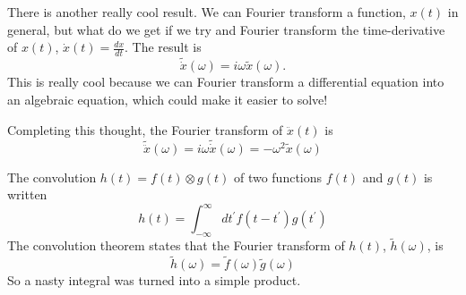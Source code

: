 \documentclass[]{revtex4}
\newcommand{\sm}[1]{{\[#1\]}}
\begin{document}
\item There is another really cool result.  We can Fourier transform a function, $x(t)$ in general, but what do we get if we
try and Fourier transform the time-derivative of $x(t)$, $\dot{x}(t) = \frac{dx}{dt}$.  The result is
\sm{\tilde{\dot{x}}(\omega) = i\omega\tilde{x}(\omega).}
This is really cool because we can Fourier transform a differential equation into an algebraic equation, which could make it easier to solve!
\item Completing this thought, the Fourier transform of $\ddot{x}(t)$ is
\sm{\tilde{\ddot{x}}(\omega) = i\omega\tilde{\dot{x}}(\omega)= -\omega^2\tilde{{x}}(\omega)}
\item The convolution $h(t)=f(t)\otimes g(t)$ of two functions $f(t)$ and $g(t)$ is written
\sm{h(t)=\int_{-\infty}^\infty dt^\prime f(t-t^\prime)g(t^\prime)\label{convolution} }
The convolution theorem states that the Fourier transform of $h(t)$, $\tilde{h}(\omega)$, is
\sm{\tilde{h}(\omega)=\tilde{f}(\omega)\tilde{g}(\omega)}
So a nasty integral was turned into a simple product.
\ei
\end{document}
